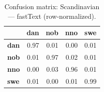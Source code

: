 \begin{table}[htbp]
\centering
\small
\begin{tabular}{lrrrr}
\toprule
 & \textbf{dan} & \textbf{nob} & \textbf{nno} & \textbf{swe} \\
\midrule
\textbf{dan} & \cellcolor{blue!97}\color{white}0.97 & \cellcolor{blue!1}0.01 & \cellcolor{blue!0}0.00 & \cellcolor{blue!1}0.01 \\
\textbf{nob} & \cellcolor{blue!1}0.01 & \cellcolor{blue!96}\color{white}0.97 & \cellcolor{blue!1}0.02 & \cellcolor{blue!0}0.01 \\
\textbf{nno} & \cellcolor{blue!0}0.00 & \cellcolor{blue!3}0.03 & \cellcolor{blue!95}\color{white}0.96 & \cellcolor{blue!0}0.01 \\
\textbf{swe} & \cellcolor{blue!0}0.01 & \cellcolor{blue!0}0.00 & \cellcolor{blue!0}0.01 & \cellcolor{blue!98}\color{white}0.99 \\
\bottomrule
\end{tabular}
\caption{Confusion matrix: Scandinavian — fastText (row-normalized).}
\label{tab:cm-scandinavian-fasttext}
\end{table}